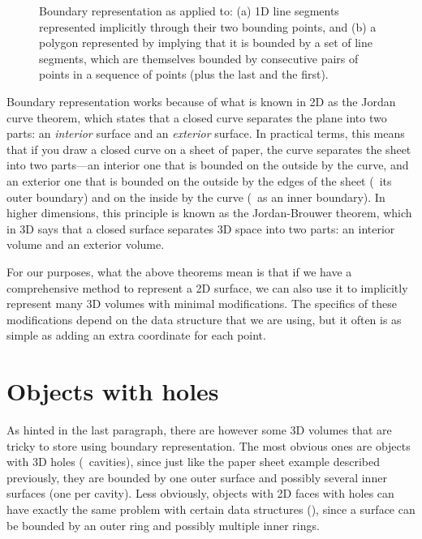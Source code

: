 \begin{figure}
\begin{subfigure}[b]{0.3\linewidth}
\caption{}%
\label{subfig:loop}
\end{subfigure}
\caption{Boundary representation as applied to: (a) 1D line segments represented implicitly through their two bounding points, and (b) a polygon represented by implying that it is bounded by a set of line segments, which are themselves bounded by consecutive pairs of points in a sequence of points (plus the last and the first).}%
\label{fig:brep}
\end{figure}

Boundary representation works because of what is known in 2D as the Jordan curve theorem, which states that a closed curve separates the plane into two parts: an \emph{interior} surface and an \emph{exterior} surface.
In practical terms, this means that if you draw a closed curve on a sheet of paper, the curve separates the sheet into two parts---an interior one that is bounded on the outside by the curve, and an exterior one that is bounded on the outside by the edges of the sheet (\ie\ its outer boundary) and on the inside by the curve (\ie\ as an inner boundary).
In higher dimensions, this principle is known as the Jordan-Brouwer theorem, which in 3D says that a closed surface separates 3D space into two parts: an interior volume and an exterior volume.

For our purposes, what the above theorems mean is that if we have a comprehensive method to represent a 2D surface, we can also use it to implicitly represent many 3D volumes with minimal modifications.
The specifics of these modifications depend on the data structure that we are using, but it often is as simple as adding an extra coordinate for each point.

\section{Objects with holes}

As hinted in the last paragraph, there are however some 3D volumes that are tricky to store using boundary representation.
The most obvious ones are objects with 3D holes (\ie\ cavities), since just like the paper sheet example described previously, they are bounded by one outer surface and possibly several inner surfaces (one per cavity).
Less obviously, objects with 2D faces with holes can have exactly the same problem with certain data structures (), since a surface can be bounded by an outer ring and possibly multiple inner rings.

